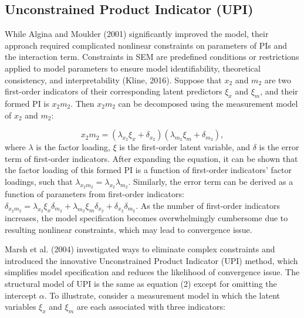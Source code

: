 \documentclass[
  man]{apa6}
\begin{document}
\subsection{Unconstrained Product Indicator (UPI)}\label{unconstrained-product-indicator-upi}

While Algina and Moulder (2001) significantly improved the model, their approach required complicated nonlinear constraints on parameters of PIs and the interaction term. Constraints in SEM are predefined conditions or restrictions applied to model parameters to ensure model identifiability, theoretical consistency, and interpretability (Kline, 2016). Suppose that \(x_{2}\) and \(m_{2}\) are two first-order indicators of their corresponding latent predictors \(\xi_{x}\) and \(\xi_{m}\), and their formed PI is \(x_{2}m_{2}\). Then \(x_{2}m_{2}\) can be decomposed using the measurement model of \(x_{2}\) and \(m_{2}\):

\begin{equation}
x_{2}m_{2}= (\lambda_{x_{2}}\xi_{x} + \delta_{x_{2}})(\lambda_{m_{2}}\xi_{m} + \delta_{m_{2}}),
\end{equation}
where \(\lambda\) is the factor loading, \(\xi\) is the first-order latent variable, and \(\delta\) is the error term of first-order indicators. After expanding the equation, it can be shown that the factor loading of this formed PI is a function of first-order indicators' factor loadings, such that \(\lambda_{x_{2}m_{2}} = \lambda_{x_{2}}\lambda_{m_{2}}\). Similarly, the error term can be derived as a function of parameters from first-order indicators: \(\delta_{x_{2}m_{2}} = \lambda_{x_{2}}\xi_{x}\delta_{m_{2}} + \lambda_{m_{2}}\xi_{m}\delta_{x_{2}} + \delta_{x_{2}}\delta_{m_{2}}\). As the number of first-order indicators increases, the model specification becomes overwhelmingly cumbersome due to resulting nonlinear constraints, which may lead to convergence issue.

Marsh et al. (2004) investigated ways to eliminate complex constraints and introduced the innovative Unconstrained Product Indicator (UPI) method, which simplifies model specification and reduces the likelihood of convergence issue. The structural model of UPI is the same as equation (2) except for omitting the intercept \(\alpha\). To illustrate, consider a measurement model in which the latent variables \(\xi_{x}\) and \(\xi_{m}\) are each associated with three indicators:
\end{document}
